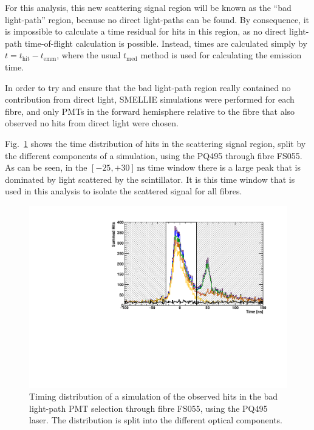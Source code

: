 For this analysis, this new scattering signal region will be known as the ``bad light-path'' region, because no direct light-paths can be found. By consequence, it is impossible to calculate a time residual for hits in this region, as no direct light-path time-of-flight calculation is possible. Instead, times are calculated simply by $t = t_{\mathrm{hit}}-t_{\mathrm{emm}}$, where the usual $t_{\mathrm{med}}$ method is used for calculating the emission time.

In order to try and ensure that the bad light-path region really contained no contribution from direct light, SMELLIE simulations were performed for each fibre, and only PMTs in the forward hemisphere relative to the fibre that also observed no hits from direct light were chosen. %

Fig.~\ref{fig:smellie_bad_lightpath_region_tracked} shows the time distribution of hits in the scattering signal region, split by the different components of a simulation, using the PQ495 through fibre FS055. As can be seen, in the $[-25,+30]\,\si{\ns}$ time window there is a large peak that is dominated by light scattered by the scintillator. It is this time window that is used in this analysis to isolate the scattered signal for all fibres. 

\begin{figure}
    \centering
    \includegraphics[width=\textwidth]{5_SMELLIEAnalysis/images/bad_lightpaths_components_plot_FS055_PQ495_Jul2022_w_window.pdf}
    \caption[Timing distribution of a simulation of the observed hits in the bad light-path PMT selection, split by optical components]
    {Timing distribution of a simulation of the observed hits in the bad light-path PMT selection through fibre FS055, using the PQ495 laser. The distribution is split into the different optical components.}
    \label{fig:smellie_bad_lightpath_region_tracked}
\end{figure}

